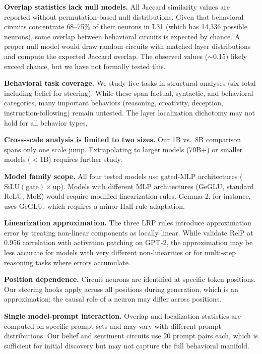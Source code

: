 \documentclass[11pt]{article}
\begin{document}
\textbf{Overlap statistics lack null models.}
All Jaccard similarity values are reported without permutation-based null distributions.
Given that behavioral circuits concentrate 68--75\% of their neurons in L31 (which has 14,336 possible neurons), some overlap between behavioral circuits is expected by chance.
A proper null model would draw random circuits with matched layer distributions and compute the expected Jaccard overlap.
The observed values (${\sim}$0.15) likely exceed chance, but we have not formally tested this.

\textbf{Behavioral task coverage.}
We study five tasks in structural analyses (six total including belief for steering). While these span factual, syntactic, and behavioral categories, many important behaviors (reasoning, creativity, deception, instruction-following) remain untested.
The layer localization dichotomy may not hold for all behavior types.

\textbf{Cross-scale analysis is limited to two sizes.}
Our 1B vs.\ 8B comparison spans only one scale jump.
Extrapolating to larger models (70B+) or smaller models ($<$1B) requires further study.

\textbf{Model family scope.}
All four tested models use gated-MLP architectures ($\text{SiLU}(\text{gate}) \times \text{up}$).
Models with different MLP architectures (GeGLU, standard ReLU, MoE) would require modified linearization rules.
Gemma-2, for instance, uses GeGLU, which requires a minor Half-rule adaptation.

\textbf{Linearization approximation.}
The three LRP rules introduce approximation error by treating non-linear components as locally linear.
While \citet{jafari2025relp} validate RelP at 0.956 correlation with activation patching on GPT-2, the approximation may be less accurate for models with very different non-linearities or for multi-step reasoning tasks where errors accumulate.

\textbf{Position dependence.}
Circuit neurons are identified at specific token positions.
Our steering hooks apply across all positions during generation, which is an approximation; the causal role of a neuron may differ across positions.

\textbf{Single model-prompt interaction.}
Overlap and localization statistics are computed on specific prompt sets and may vary with different prompt distributions.
Our belief and sentiment circuits use 20 prompt pairs each, which is sufficient for initial discovery but may not capture the full behavioral manifold.
\end{document}
